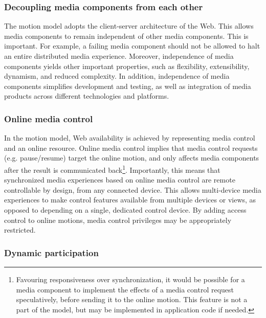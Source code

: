 \subsubsection{Decoupling media components from each other}

The motion model adopts the client-server architecture of the Web. This allows
media components to remain independent of other media components. This is
important. For example, a failing media component should not be allowed to
halt an entire distributed media experience. Moreover, independence of media
components yields other important properties, such as flexibility,
extensibility, dynamism, and reduced complexity. In addition, independence of
media components simplifies development and testing, as well as integration of
media products across different technologies and platforms.

\subsubsection{Online media control}

In the motion model, Web availability is achieved by representing media
control and an online resource. Online media control implies that media
control requests (e.g. pause/resume) target the online motion, and only
affects media components after the result is communicated
back\footnote{Favouring responsiveness over synchronization, it would be
possible for a media component to implement the effects of a media control
request speculatively, before sending it to the online motion. This feature is
not a part of the model, but may be implemented in application code if needed.
}. Importantly, this means that synchronized media experiences based on online
media control are remote controllable by design, from any connected device.
This allows multi-device media experiences to make control features available
from multiple devices or views, as opposed to depending on a single, dedicated
control device. By adding access control to online motions, media control
privileges may be appropriately restricted.


\subsubsection{Dynamic participation}

